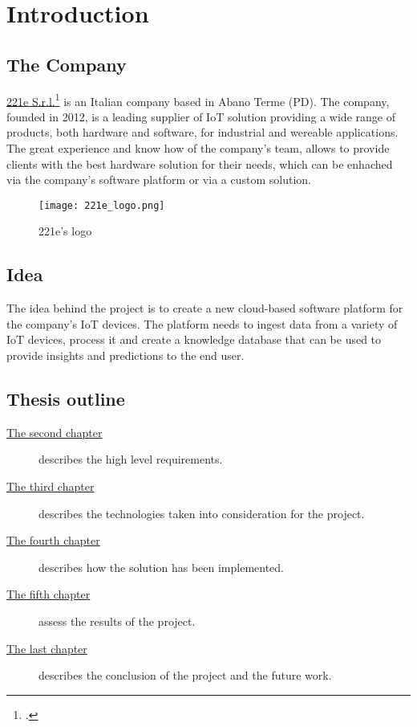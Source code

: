 \chapter{Introduction}
\label{cap:introduction}

\section{The Company}
\href{https://www.221e.com/about-us}{221e S.r.l.}\footcite{site:221e} is an Italian company based in Abano Terme (PD). 
The company, founded in 2012, is a leading supplier of IoT solution providing  a wide range of products,
both hardware and software, for industrial and wereable applications.
The great experience and know how of the company's team, allows to provide clients with the best hardware solution
for their needs, which can be enhached via the company's software platform or via a custom solution.
\begin{figure}[htbp]
    \centering
    \texttt{[image: 221e\_logo.png]}
    \caption{221e's logo}
\end{figure}

\section{Idea}

The idea behind the project is to create a new cloud-based software platform for the company's IoT devices.
The platform needs to ingest data from a variety of IoT devices, process it and create a knowledge database that can be used to
provide insights and predictions to the end user.

\section{Thesis outline}

\begin{description}
    \item[{\hyperref[cap:requirements]{The second chapter}}] describes the high level requirements.
    \item [{\hyperref[cap:technologies]{The third chapter}}] describes the technologies taken into consideration for the project.
    \item[{\hyperref[cap:method]{The fourth chapter}}] describes how the solution has been implemented.
    \item[{\hyperref[cap:results]{The fifth chapter}}] assess the results of the project.
    \item[{\hyperref[cap:conclusion]{The last chapter}}] describes the conclusion of the project and the future work.
\end{description}
